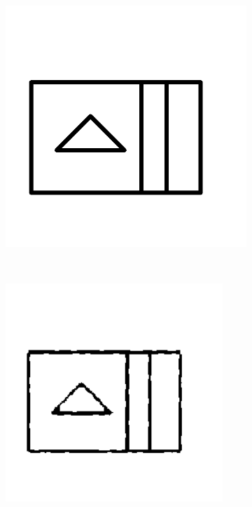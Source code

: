     \begin{figure}[h]
        \centering
                \begin{subfigure}[b]{0.2\textwidth}
                \centering
                \includegraphics[width=1.1\textwidth]{figures/Results/NoiseA/Model.png}
                \caption{}
        \end{subfigure}\\
                \begin{subfigure}[b]{0.25\textwidth}
                \centering
                \includegraphics[width=0.9\textwidth]{figures/Results/NoiseA/1.png}

\end{subfigure}
\end{figure}
